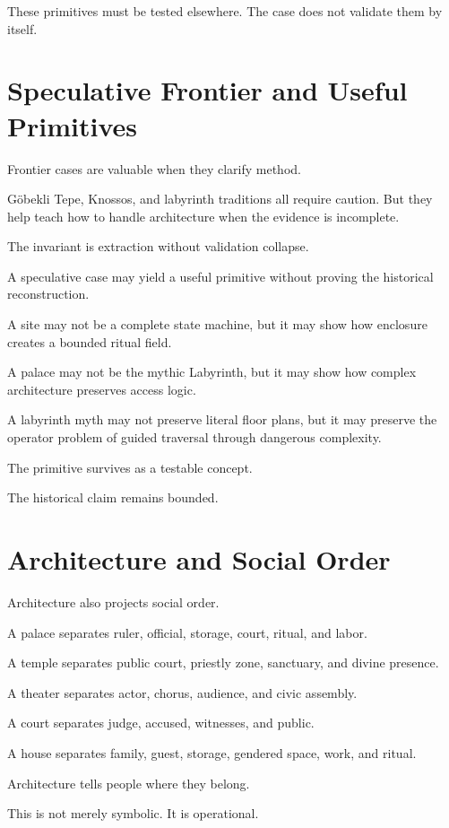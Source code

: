 \documentclass[11pt]{book}
\begin{document}
These primitives must be tested elsewhere. The case does not validate them by itself.

\section{Speculative Frontier and Useful Primitives}

Frontier cases are valuable when they clarify method.

Göbekli Tepe, Knossos, and labyrinth traditions all require caution. But they help teach how to handle architecture when the evidence is incomplete.

The invariant is extraction without validation collapse.

A speculative case may yield a useful primitive without proving the historical reconstruction.

A site may not be a complete state machine, but it may show how enclosure creates a bounded ritual field.

A palace may not be the mythic Labyrinth, but it may show how complex architecture preserves access logic.

A labyrinth myth may not preserve literal floor plans, but it may preserve the operator problem of guided traversal through dangerous complexity.

The primitive survives as a testable concept.

The historical claim remains bounded.

\section{Architecture and Social Order}

Architecture also projects social order.

A palace separates ruler, official, storage, court, ritual, and labor.

A temple separates public court, priestly zone, sanctuary, and divine presence.

A theater separates actor, chorus, audience, and civic assembly.

A court separates judge, accused, witnesses, and public.

A house separates family, guest, storage, gendered space, work, and ritual.

Architecture tells people where they belong.

This is not merely symbolic. It is operational.
\end{document}
